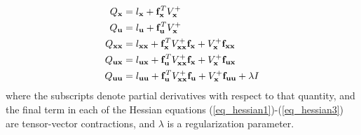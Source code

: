 \begin{align}
	Q_{\mathbf{x}} &= l_{\mathbf{x}} + \mathbf{f}_{\mathbf{x}}^T V^+_{\mathbf{x}} \\
	Q_{\mathbf{u}} &= l_{\mathbf{u}} + \mathbf{f}_{\mathbf{u}}^T V^+_{\mathbf{x}} \\
	Q_{\mathbf{x}\mathbf{x}} &= l_{\mathbf{x}\mathbf{x}} + \mathbf{f}_{\mathbf{x}}^T V^+_{\mathbf{x}\mathbf{x}}\mathbf{f}_{\mathbf{x}} + V^+_{\mathbf{x}} \mathbf{f}_{\mathbf{x}\mathbf{x}} \label{eq_hessian1}\\
	Q_{\mathbf{u}\mathbf{x}} &= l_{\mathbf{u}\mathbf{x}} + \mathbf{f}_{\mathbf{u}}^T V^+_{\mathbf{x}\mathbf{x}}\mathbf{f}_{\mathbf{x}} + V^+_{\mathbf{x}} \mathbf{f}_{\mathbf{u}\mathbf{x}} \label{eq_hessian2}\\
	Q_{\mathbf{u}\mathbf{u}} &= l_{\mathbf{u}\mathbf{u}} + \mathbf{f}_{\mathbf{u}}^T V^+_{\mathbf{x}\mathbf{x}}\mathbf{f}_{\mathbf{u}} + V^+_{\mathbf{x}} \mathbf{f}_{\mathbf{u}\mathbf{u}} +\lambda I \label{eq_hessian3}
\end{align}
where the subscripts denote partial derivatives with respect to that quantity, and the final term in each of the Hessian equations (\ref{eq_hessian1})-(\ref{eq_hessian3}) are tensor-vector contractions, and $ \lambda $ is a regularization parameter.  %

